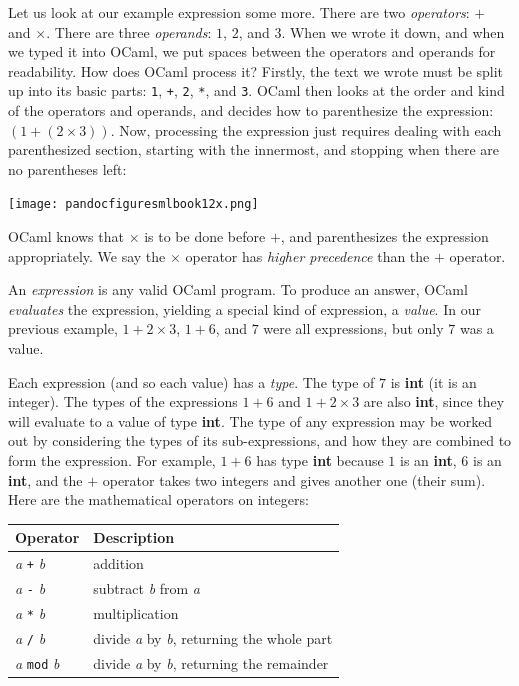 \documentclass[]{book}
\newcommand{\smspace}{\vspace{4mm}}
\begin{document}
Let us look at our example expression some more. There are two \textit{operators}: $+$ and $\times$. There are three \textit{operands}: $1$,
$2$, and $3$.  When we wrote it down,
and when we typed it into OCaml, we put spaces between the operators and
operands for readability. How does OCaml process it? Firstly, the text we wrote must be split up into its
basic parts: \verb!1!, \verb!+!, \verb!2!, \verb!*!, and \verb!3!. OCaml then
looks at the order and kind of the operators and operands, and decides how to
parenthesize the expression: $(1 + (2 \times 3))$. Now, processing the expression
just requires dealing with each parenthesized section, starting with the innermost, and stopping when there are no parentheses left:

\medskip
\begin{center}
\noindent\texttt{[image: pandocfiguresmlbook12x.png]}
\end{center}
\medskip

\noindent OCaml knows that $\times$ is to be done before $+$, and parenthesizes the expression appropriately. We say the $\times$ operator has \textit{higher precedence} than the $+$ operator.

An \textit{expression} is any valid OCaml program. To produce an answer, OCaml
\textit{evaluates} the expression, yielding a special kind of expression, a
\textit{value}. In our previous example, $1 + 2 \times 3$, $1 + 6$, and $7$ were all
expressions, but only $7$ was a value.

Each expression (and so each value) has a \textit{type}. The type of $7$ is
\textsf{\textbf{int}} (it is an integer). The types of the expressions $1 + 6$ and $1 + 2 \times 3$ are also
\textsf{\textbf{int}}, since they will evaluate to a value of type \textsf{\textbf{int}}. The type of any expression may be worked out by considering the types of its
 sub-expressions, and how they are combined to form the expression. For example, $1 + 6$ has
type \textsf{\textbf{int}} because $1$ is an \textsf{\textbf{int}}, $6$ is an \textsf{\textbf{int}}, and
the $+$ operator takes two integers and gives another one (their sum). Here are the mathematical operators on integers:

\smspace
\noindent\begin{tabular}{@{}ll@{}} \toprule
Operator & Description\\
\midrule
\index{+@\texttt{+}}\textit{a} \texttt{+} \textit{b} & addition\\
\index{-@\texttt{-}}\textit{a} \texttt{-} \textit{b} & subtract \textit{b} from \textit{a}\\
\index{*@\texttt{*}}\textit{a} \texttt{*} \textit{b} & multiplication\\
\index{/@\texttt{/}}\textit{a} \texttt{/} \textit{b} & divide \textit{a} by \textit{b}, returning the whole part\\
\index{mod@\texttt{mod}}\textit{a} \texttt{mod} \textit{b} & divide \textit{a} by \textit{b}, returning the remainder\\ \bottomrule
\end{tabular}
\smspace
\end{document}
